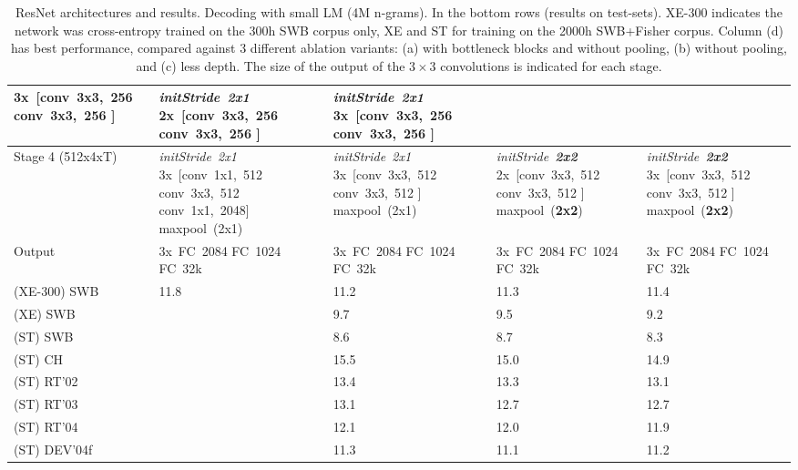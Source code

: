 \documentclass[a4paper]{article}
\begin{document}
\begin{table}[htpb!]
{\begin{tabular}{| L{0.25\columnwidth} | R{0.30\columnwidth} | R{0.30\columnwidth} | R{0.30\columnwidth} | R{0.30\columnwidth}| }
3x~[conv~3x3,~256
  conv~3x3,~256 ]
& \textit{initStride~2x1}
2x~[conv~3x3,~256
  conv~3x3,~256 ]
& \textit{initStride~2x1}
3x~[conv~3x3,~256
  conv~3x3,~256 ]
\\
\hline
Stage 4
(512x4xT)
& \textit{initStride~2x1}
3x~[conv~1x1,~512
conv~3x3,~512
conv~1x1,~2048]
maxpool~(2x1)
& \textit{initStride~2x1}
3x~[conv~3x3,~512
  conv~3x3,~512 ]
maxpool~(2x1)
& \textit{initStride~\textbf{2x2}}
2x~[conv~3x3,~512
  conv~3x3,~512 ]
maxpool~(\textbf{2x2})
& \textit{initStride~\textbf{2x2}}
3x~[conv~3x3,~512
  conv~3x3,~512 ]
maxpool~(\textbf{2x2})
\\
\hline
Output 
& 3x~FC~2084 \qquad\qquad
FC~1024\qquad\qquad
FC~32k
& 3x~FC~2084 \qquad\qquad
FC~1024\qquad\qquad
FC~32k
& 3x~FC~2084 \qquad\qquad
FC~1024\qquad\qquad
FC~32k
& 3x~FC~2084 \qquad\qquad
FC~1024\qquad\qquad
FC~32k
\\
\hline
\hline
(XE-300) SWB & 11.8 & 11.2 & 11.3 &  11.4 \\ \hline
(XE) SWB     &      &  9.7 & 9.5  &  9.2  \\ \hline
(ST) SWB     &      & 8.6  & 8.7  & 8.3  \\ \hline
(ST) CH      &      & 15.5 & 15.0 & 14.9 \\ \hline
(ST) RT'02   &      & 13.4 & 13.3 & 13.1 \\ \hline
(ST) RT'03   &      & 13.1 & 12.7 & 12.7 \\ \hline
(ST) RT'04   &      & 12.1 & 12.0 & 11.9 \\ \hline
(ST) DEV'04f &      & 11.3 & 11.1 & 11.2 \\ 
\hline
\end{tabular}}
\caption{ResNet architectures and results.
Decoding with small LM (4M n-grams).
        In the bottom rows (results on test-sets). XE-300 indicates the network was cross-entropy trained on the 300h SWB corpus only,
        XE and ST for training on the 2000h SWB+Fisher corpus.
        Column (d) has best performance, compared against 3 different ablation variants: (a) with bottleneck blocks and without pooling, (b) without pooling, and (c) less depth.
        The size of the output of the $3 \times 3$ convolutions is indicated for each stage.
}
      \label{tab:resnet} 
\end{table}
\end{document}
